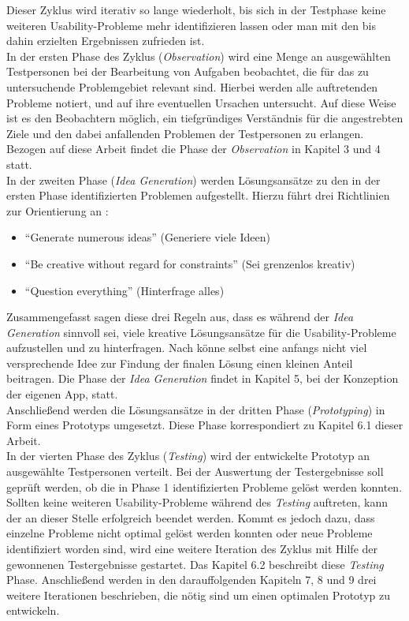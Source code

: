 \noindent
Dieser Zyklus wird iterativ so lange wiederholt, bis sich in der Testphase keine weiteren Usability-Probleme mehr identifizieren lassen oder man mit den bis dahin erzielten Ergebnissen zufrieden ist. \\

In der ersten Phase des Zyklus (\emph{Observation}) wird eine Menge an ausgewählten Testpersonen bei der Bearbeitung von Aufgaben beobachtet, die für das zu untersuchende Problemgebiet relevant sind.
Hierbei werden alle auftretenden Probleme notiert, und auf ihre eventuellen Ursachen untersucht.
Auf diese Weise ist es den Beobachtern möglich, ein tiefgründiges Verständnis für die angestrebten Ziele und den dabei anfallenden Problemen der Testpersonen zu erlangen.
Bezogen auf diese Arbeit findet die Phase der \emph{Observation} in Kapitel 3 und 4 statt. \\

In der zweiten Phase (\emph{Idea Generation}) werden Lösungsansätze zu den in der ersten Phase identifizierten Problemen aufgestellt.
Hierzu führt \citeauthor{Norman13} drei Richtlinien zur Orientierung an \citep[Seite 226]{Norman13}:

\begin{itemize}
  \item ``Generate numerous ideas'' (Generiere viele Ideen)
  \item ``Be creative without regard for constraints'' (Sei grenzenlos kreativ)
  \item ``Question everything'' (Hinterfrage alles)
\end{itemize}

\noindent
Zusammengefasst sagen diese drei Regeln aus, dass es während der \emph{Idea Generation} sinnvoll sei, viele kreative Lösungsansätze für die Usability-Probleme aufzustellen und zu hinterfragen.
Nach \citeauthor{Norman13} könne selbst eine anfangs nicht viel versprechende Idee zur Findung der finalen Lösung einen kleinen Anteil beitragen.
Die Phase der \emph{Idea Generation} findet in Kapitel 5, bei der Konzeption der eigenen App, statt. \\

Anschließend werden die Lösungsansätze in der dritten Phase (\emph{Prototyping}) in Form eines Prototyps umgesetzt.
Diese Phase korrespondiert zu Kapitel 6.1 dieser Arbeit. \\

In der vierten Phase des Zyklus (\emph{Testing}) wird der entwickelte Prototyp an ausgewählte Testpersonen verteilt.
Bei der Auswertung der Testergebnisse soll geprüft werden, ob die in Phase 1 identifizierten Probleme gelöst werden konnten.
Sollten keine weiteren Usability-Probleme während des \emph{Testing} auftreten, kann der \hcdp{} an dieser Stelle erfolgreich beendet werden.
Kommt es jedoch dazu, dass einzelne Probleme nicht optimal gelöst werden konnten oder neue Probleme identifiziert worden sind, wird eine weitere Iteration des Zyklus mit Hilfe der gewonnenen Testergebnisse gestartet.
Das Kapitel 6.2 beschreibt diese \emph{Testing} Phase.
Anschließend werden in den darauffolgenden Kapiteln 7, 8 und 9 drei weitere Iterationen beschrieben, die nötig sind um einen optimalen Prototyp zu entwickeln.
